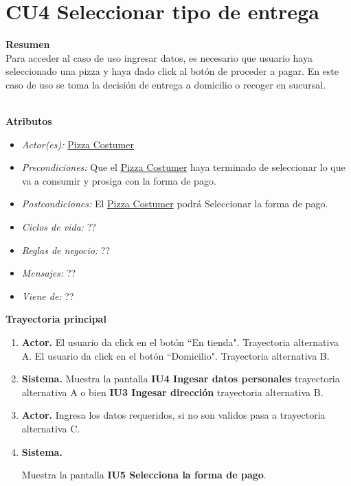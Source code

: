 		
\section{CU4 Seleccionar tipo de entrega}

\noindent \textbf{Resumen}\\

Para acceder al caso de uso ingresar datos, es necesario que usuario haya seleccionado una pizza y haya dado click al botón de proceder a pagar. En este caso de uso se toma la decisión de entrega a domicilio o recoger en sucursal.

\noindent \textbf{\\Atributos}

\begin{itemize}
	
	\item \textit{Actor(es):} \hyperlink{A:Pizza Costumer}{Pizza Costumer}
	\item \textit{Precondiciones:} Que el \hyperlink{A:Pizza Costumer}{Pizza Costumer} haya terminado de seleccionar lo que va a consumir y prosiga con la forma de pago. 
	\item \textit{Postcondiciones:} El \hyperlink{A:Pizza Costumer}{Pizza Costumer} podrá Seleccionar la forma de pago.
	\item \textit{Ciclos de vida:} ??
	\item \textit{Reglas de negocio:} ??
	\item \textit{Mensajes:} ??
	\item \textit{Viene de:} ??
	
\end{itemize} 

\noindent \textbf{Trayectoria principal}

\begin{enumerate}
	\item {\textbf{Actor.}} El usuario da click en el botón ``En tienda". \hypertarget{CU4:TAB}{Trayectoria alternativa A.}\newline
	El usuario da click en el botón ``Domicilio". \hypertarget{CU4:TAB}{Trayectoria alternativa B.} 
	\item \textbf{Sistema.} Muestra la pantalla \textbf{IU4 Ingesar datos personales} trayectoria alternativa A o bien \textbf{IU3 Ingesar dirección} trayectoria alternativa B.
	\item \textbf{Actor.} Ingresa los datos requeridos, si no son validos pasa a trayectoria alternativa C.
	\item \hypertarget{CU1:TP:P4}{\textbf{Sistema.}} Muestra la pantalla  \textbf{IU5 Selecciona la forma de pago}.
	
\end{enumerate}

